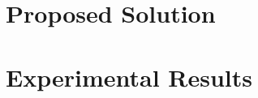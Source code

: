 




\label{ch:examples}
\section{Proposed Solution} %
\label{sec:proposed_solution}



\section{Experimental Results} %
\label{sec:experimental_results}


